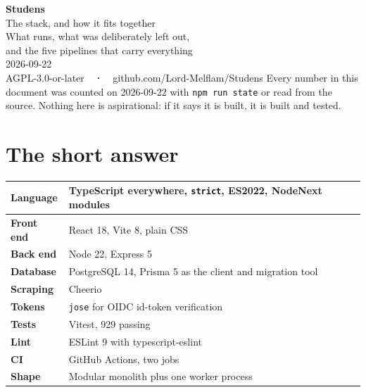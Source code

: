 \documentclass[11pt,a4paper]{article}
\begin{document}
\begin{titlepage}
\centering
\vspace*{3cm}
{\sffamily\Huge\bfseries\color{studens} Studens}\\[0.6em]
{\sffamily\LARGE The stack, and how it fits together}\\[2em]
{\sffamily\large\color{muted} What runs, what was deliberately left out,\\
and the five pipelines that carry everything}\\[3em]
{\sffamily\normalsize\color{muted} 2026-09-22}\\[0.4em]
{\sffamily\footnotesize\color{muted} AGPL-3.0-or-later\ \ \textbf{·}\ \
github.com/Lord-Melflam/Studens}
\vfill
{\sffamily\footnotesize\color{muted}
Every number in this document was counted on 2026-09-22 with
\texttt{npm run state} or read from the source. Nothing here is aspirational:
if it says it is built, it is built and tested.}
\end{titlepage}

\tableofcontents
\newpage

\section{The short answer}

\begin{center}
\sffamily\small
\begin{tabular}{@{}>{\bfseries}l l@{}}
\toprule
Language & TypeScript everywhere, \texttt{strict}, ES2022, NodeNext modules \\
\midrule
Front end & React 18, Vite 8, plain CSS \\
Back end & Node 22, Express 5 \\
Database & PostgreSQL 14, Prisma 5 as the client and migration tool \\
Scraping & Cheerio \\
Tokens & \texttt{jose} for OIDC id-token verification \\
Tests & Vitest, 929 passing \\
Lint & ESLint 9 with typescript-eslint \\
CI & GitHub Actions, two jobs \\
Shape & Modular monolith plus one worker process \\
\bottomrule
\end{tabular}
\end{center}
\end{document}
